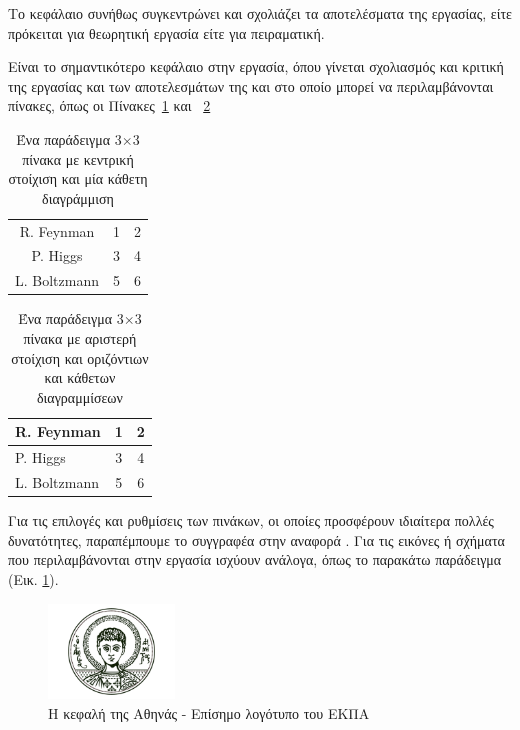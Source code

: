 Το κεφάλαιο συνήθως συγκεντρώνει και σχολιάζει
τα αποτελέσματα της εργασίας, είτε πρόκειται για θεωρητική εργασία
είτε για πειραματική.

Είναι το σημαντικότερο κεφάλαιο στην εργασία, όπου γίνεται σχολιασμός
και κριτική της εργασίας και των αποτελεσμάτων της και στο οποίο μπορεί
να περι\-λαμβάνονται πίνακες, όπως οι Πίνακες~\ref{tab:no1} και ~\ref{tab:no2}

\begin{table}[ht]
\centering
\begin{tabular}{c|cc}
R. Feynman & 1 & 2 \\
P. Higgs & 3 & 4 \\
L. Boltzmann & 5 & 6
\end{tabular}
\caption{Ένα παράδειγμα 3$\times$3 πίνακα με κεντρική στοίχιση και μία κάθετη διαγράμμιση}
\label{tab:no1}
\end{table}

\begin{table}[ht]
\centering
\begin{tabular}{l|cc}
R. Feynman & 1 & 2 \\\hline
P. Higgs & 3 & 4 \\\hline
L. Boltzmann & 5 & 6
\end{tabular}
\caption{Ένα παράδειγμα 3$\times$3 πίνακα με αριστερή στοίχιση και οριζόντιων και κάθετων διαγραμμίσεων}
\label{tab:no2}
\end{table}

Για τις επιλογές και ρυθμίσεις των πινάκων, οι οποίες προσφέρουν ιδιαίτερα
πολλές δυνατότητες, παραπέμπουμε το συγγραφέα στην αναφορά \cite{wiki_latex}.
Για τις εικόνες ή σχήματα που περιλαμβάνονται
στην εργασία ισχύουν ανάλογα, όπως το παρακάτω παράδειγμα (Εικ. \ref{fig:uoa_logo}).

\begin{figure}[h!]
\centering
\includegraphics[width=0.3\textwidth]{aristotle_logo.png}
\caption{Η κεφαλή της Αθηνάς - Επίσημο λογότυπο του ΕΚΠΑ}
\label{fig:uoa_logo}
\end{figure}